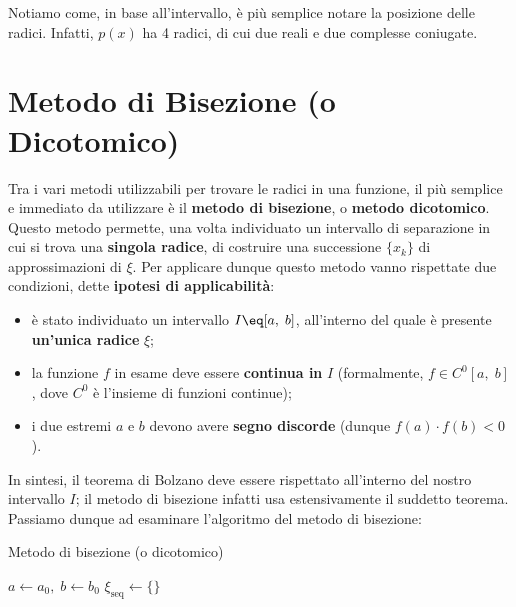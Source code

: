 Notiamo come, in base all'intervallo, è più semplice notare la posizione delle radici. Infatti, $p(x)$ ha 4 radici, di cui due reali e due complesse coniugate.

\section{Metodo di Bisezione (o Dicotomico)}

Tra i vari metodi utilizzabili per trovare le radici in una funzione, il più semplice e immediato da utilizzare è il \textbf{metodo di bisezione}, o \textbf{metodo dicotomico}. Questo metodo permette, una volta individuato un intervallo di separazione in cui si trova una \textbf{singola radice}, di costruire una successione $\{ x_k \}$ di approssimazioni di $\xi$. Per applicare dunque questo metodo vanno rispettate due condizioni, dette \textbf{ipotesi di applicabilità}:
\begin{itemize}
    \item è stato individuato un intervallo $I \eq [a, \; b]$, all'interno del quale è presente \textbf{un'unica radice} $\xi$;
    \item la funzione $f$ in esame deve essere \textbf{continua in} $I$ (formalmente, $f \in C^0 [a, \; b]$, dove $C^0$ è l'insieme di funzioni continue);
    \item i due estremi $a$ e $b$ devono avere \textbf{segno discorde} (dunque $f(a) \cdot f(b) < 0$).
\end{itemize}

In sintesi, il teorema di Bolzano deve essere rispettato all'interno del nostro intervallo $I$; il metodo di bisezione infatti usa estensivamente il suddetto teorema. Passiamo dunque ad esaminare l'algoritmo del metodo di bisezione:

\begin{algorithm}[H]
    \caption{Metodo di bisezione (o dicotomico)}
    $a \gets a_0, \; b \gets b_0$\;
    $\xi_{\text{seq}} \gets \{\}$ 
\end{algorithm}

